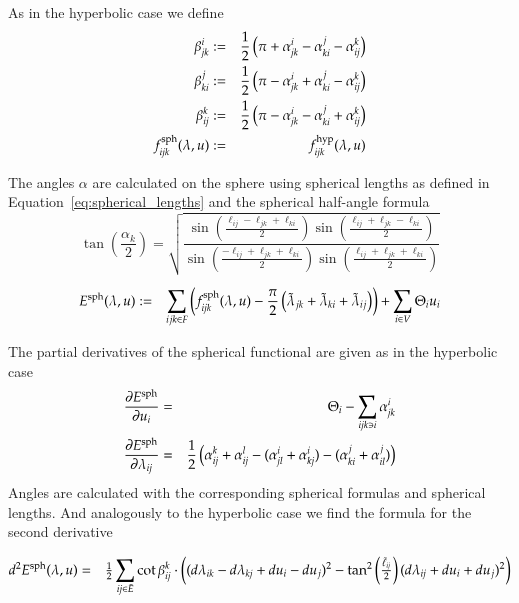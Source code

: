 \documentclass[Thesis]{subfiles}
\begin{document}
\begin{definition}
As in the hyperbolic case we define
\begin{eqnarray*}
	\beta_{\it jk}^i &:=& \frac{1}{2} \left(\pi + \alpha_{\it jk}^i - \alpha_{\it ki}^j - \alpha_{\it ij}^k \right)\\
	\beta_{\it ki}^j &:=& \frac{1}{2} \left(\pi - \alpha_{\it jk}^i + \alpha_{\it ki}^j - \alpha_{\it ij}^k \right)\\
	\beta_{\it ij}^k &:=& \frac{1}{2} \left(\pi - \alpha_{\it jk}^i - \alpha_{\it ki}^j + \alpha_{\it ij}^k \right)\\
	f^{\rm sph}_{\it ijk}(\lambda, u) &:=& f^{\rm hyp}_{\it ijk}(\lambda, u)
\end{eqnarray*}	
\end{definition}

The angles $\alpha$ are calculated on the sphere using spherical lengths as defined in 
Equation~\ref{eq:spherical_lengths} and the spherical half-angle formula
\[
  \tan\left(\frac{\alpha_k}{2}\right)=
  \sqrt{\frac{
      \sin(\frac{\ell_{ij}-\ell_{jk}+\ell_{ki}}{2})
      \sin(\frac{\ell_{ij}+\ell_{jk}-\ell_{ki}}{2})
    }{
      \sin(\frac{-\ell_{ij}+\ell_{jk}+\ell_{ki}}{2})
      \sin(\frac{\ell_{ij}+\ell_{jk}+\ell_{ki}}{2})
    }}
\]

\begin{eqnarray}
	E^{\rm sph}(\lambda, u) &:=& \sum_{ijk\in F}\left(f_{\it ijk}^{\rm sph}(\lambda, u) - \frac{\pi}{2}\left(\tilde \lambda_{jk} + \tilde \lambda_{ki} + \tilde \lambda_{ij}\right)\right) + \sum_{i\in V} \Theta_i u_i
\end{eqnarray}

The partial derivatives of the spherical functional are given as in the hyperbolic case
\begin{eqnarray}
	\frac{\partial E^{\rm sph}}{\partial u_i} &=& \Theta_i - \sum_{\it ijk\ni i}\alpha^i_{\it jk} \\
	\frac{\partial E^{\rm sph}}{\partial \lambda_{\it ij}} &=& 
	\frac{1}{2}\left(\alpha_{\it ij}^k + \alpha_{\it ij}^l - (\alpha^i_{\it jl} + \alpha^i_{\it kj}) - (\alpha^j_{\it ki} + \alpha^j_{\it il})\right)
\end{eqnarray}
Angles are calculated with the corresponding spherical formulas and spherical lengths.
And analogously to the hyperbolic case we find the formula for the second derivative

\begin{eqnarray*}
d^2E^{\rm sph}(\lambda, u)
&=& \tfrac{1}{2}\sum_{\it ij\in \bar{E}} \cot\beta^k_{\it ij} \cdot 
 \left((d\lambda_{\it ik}-d\lambda_{\it kj} +  du_i-du_j)^2-\tan^2\left(\tfrac{\tilde \ell_{\it ij}}{2}\right)(d\lambda_{\it ij} +du_i+du_j)^2\right)
\end{eqnarray*}
\end{document}
